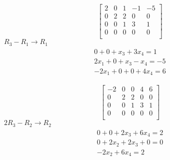 \documentclass[12pt letter]{report}
\begin{document}
{\begin{enumerate}
          \[
            \begin{bmatrix}
              2 & 0 & 1 & -1 & -5 \\
              0 & 2 & 2 & 0  & 0  \\
              0 & 0 & 1 & 3  & 1  \\
              0 & 0 & 0 & 0  & 0  \\
            \end{bmatrix}
          \]
          $R_3 - R_1 \to R_1$
          \begin{align*}
            \begin{split}
              0 + 0 + x_3 + 3x_4 = 1    \\
              2x_1 + 0 + x_3 - x_4 = -5 \\
              \hline
              -2x_1 + 0 + 0 + 4x_4 = 6
            \end{split}
          \end{align*}

          \[
            \begin{bmatrix}
              -2 & 0 & 0 & 4 & 6 \\
              0  & 2 & 2 & 0 & 0 \\
              0  & 0 & 1 & 3 & 1 \\
              0  & 0 & 0 & 0 & 0 \\
            \end{bmatrix}
          \]
          $2R_3 - R_2 \to R_2$
          \begin{align*}
            \begin{split}
              0 + 0 + 2x_3 + 6x_4 = 2 \\
              0 + 2x_2 + 2x_3 + 0 = 0 \\
              \hline
              -2x_2 + 6x_4 = 2
            \end{split}
          \end{align*}


\end{enumerate}}
\end{document}
